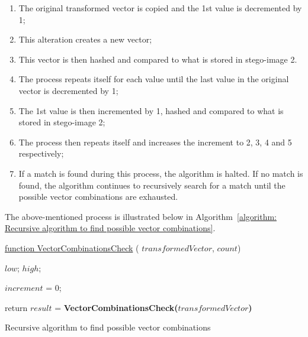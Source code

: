 \begin{enumerate}[label=\roman*.]
    \item The original transformed vector is copied and the 1st value is decremented by 1;
    \item This alteration creates a new vector;
    \item This vector is then hashed and compared to what is stored in stego-image 2.
    \item The process repeats itself for each value until the last value in the original vector is decremented by 1;
    \item The 1st value is then incremented by 1, hashed and compared to what is stored in stego-image 2;
    \item The process then repeats itself and increases the increment to 2, 3, 4 and 5 respectively;
    \item If a match is found during this process, the algorithm is halted. If no match is found, the algorithm continues to recursively search for a match until the possible vector combinations are exhausted.
\end{enumerate}

The above-mentioned process is illustrated below in Algorithm~\ref{algorithm: Recursive algorithm to find possible vector combinations}.

\begin{algorithm}
     
     \underline{function VectorCombinationsCheck} ( $transformedVector$, $count$)\;
     
      $low$;
      $high$;
     
     $increment$ = 0;
     
     
     
     return $result$ = \textbf{VectorCombinationsCheck($transformedVector$)}
     
     \caption{Recursive algorithm to find possible vector combinations}
     \label{algorithm: Recursive algorithm to find possible vector combinations}
     
\end{algorithm}

